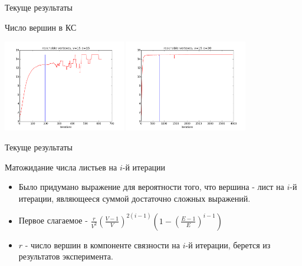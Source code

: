 \documentclass{beamer}
\begin{document}
\begin{frame}{Текуще результаты}
\begin{block}{Число вершин в КС}
\begin{center}
\includegraphics*[height=4cm]{pic/reachable_vertexes_v15e15.png}
\includegraphics*[height=4cm]{pic/reachable_vertexes_v15e30.png}
\end{center}
\end{block}
\end{frame}

\begin{frame}{Текуще результаты}
\begin{block}{Матожидание числа листьев на $i$-й итерации}
\begin{itemize}
 \item Было придумано выражение для вероятности того, что вершина - лист на $i$-й итерации, являющееся суммой достаточно сложных 
выражений.
 \item Первое слагаемое - $\frac{r}{V^2}\left(\frac{V - 1}{V} \right)^{2(i-1)}\left( 1 - \left(\frac{E - 1}{E} \right)^{i - 1} \right)$
 \item $r$  - число вершин в компоненте связности на $i$-й итерации, берется из результатов эксперимента.
\end{itemize}
\end{block}
\end{frame}
\end{document}
